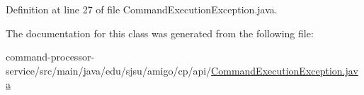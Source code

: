 Definition at line 27 of file Command\+Execution\+Exception.\+java.



The documentation for this class was generated from the following file\+:\begin{DoxyCompactItemize}
\item 
command-\/processor-\/service/src/main/java/edu/sjsu/amigo/cp/api/\hyperlink{_command_execution_exception_8java}{Command\+Execution\+Exception.\+java}\end{DoxyCompactItemize}
